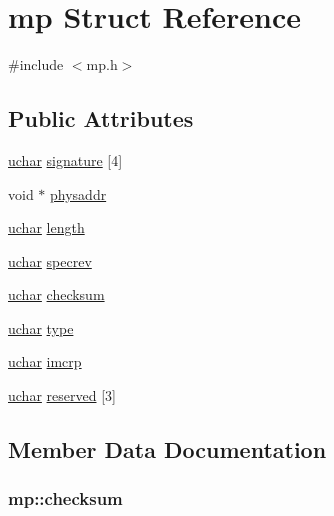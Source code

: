 \hypertarget{structmp}{}\section{mp Struct Reference}
\label{structmp}


{\ttfamily \#include $<$mp.\+h$>$}

\subsection*{Public Attributes}
\begin{DoxyCompactItemize}
\item 
\hyperlink{types_8h_a65f85814a8290f9797005d3b28e7e5fc}{uchar} \hyperlink{structmp_af2bfc400b8e6edae4c0e6ff437a2a1f4}{signature} \mbox{[}4\mbox{]}
\item 
void $\ast$ \hyperlink{structmp_a3333bff25a42470efb69b3b01f08d6ce}{physaddr}
\item 
\hyperlink{types_8h_a65f85814a8290f9797005d3b28e7e5fc}{uchar} \hyperlink{structmp_a46a03e7ef27f7290a5fb49bcb4c3c507}{length}
\item 
\hyperlink{types_8h_a65f85814a8290f9797005d3b28e7e5fc}{uchar} \hyperlink{structmp_a0be99b736e3c6fb1f405944868674063}{specrev}
\item 
\hyperlink{types_8h_a65f85814a8290f9797005d3b28e7e5fc}{uchar} \hyperlink{structmp_a0d403ddb2898b8cadf31f9f75d31163a}{checksum}
\item 
\hyperlink{types_8h_a65f85814a8290f9797005d3b28e7e5fc}{uchar} \hyperlink{structmp_a08cf79f94b4dcfce588ccb41f90cbe0e}{type}
\item 
\hyperlink{types_8h_a65f85814a8290f9797005d3b28e7e5fc}{uchar} \hyperlink{structmp_ae2157bc407a7423c57bdb078b70cd6e5}{imcrp}
\item 
\hyperlink{types_8h_a65f85814a8290f9797005d3b28e7e5fc}{uchar} \hyperlink{structmp_a7a87ebdff0db6123f294d93ee98c42ab}{reserved} \mbox{[}3\mbox{]}
\end{DoxyCompactItemize}


\subsection{Member Data Documentation}
\subsubsection[{\texorpdfstring{checksum}{checksum}}]{ mp\+::checksum}\hypertarget{structmp_a0d403ddb2898b8cadf31f9f75d31163a}{}\label{structmp_a0d403ddb2898b8cadf31f9f75d31163a}
